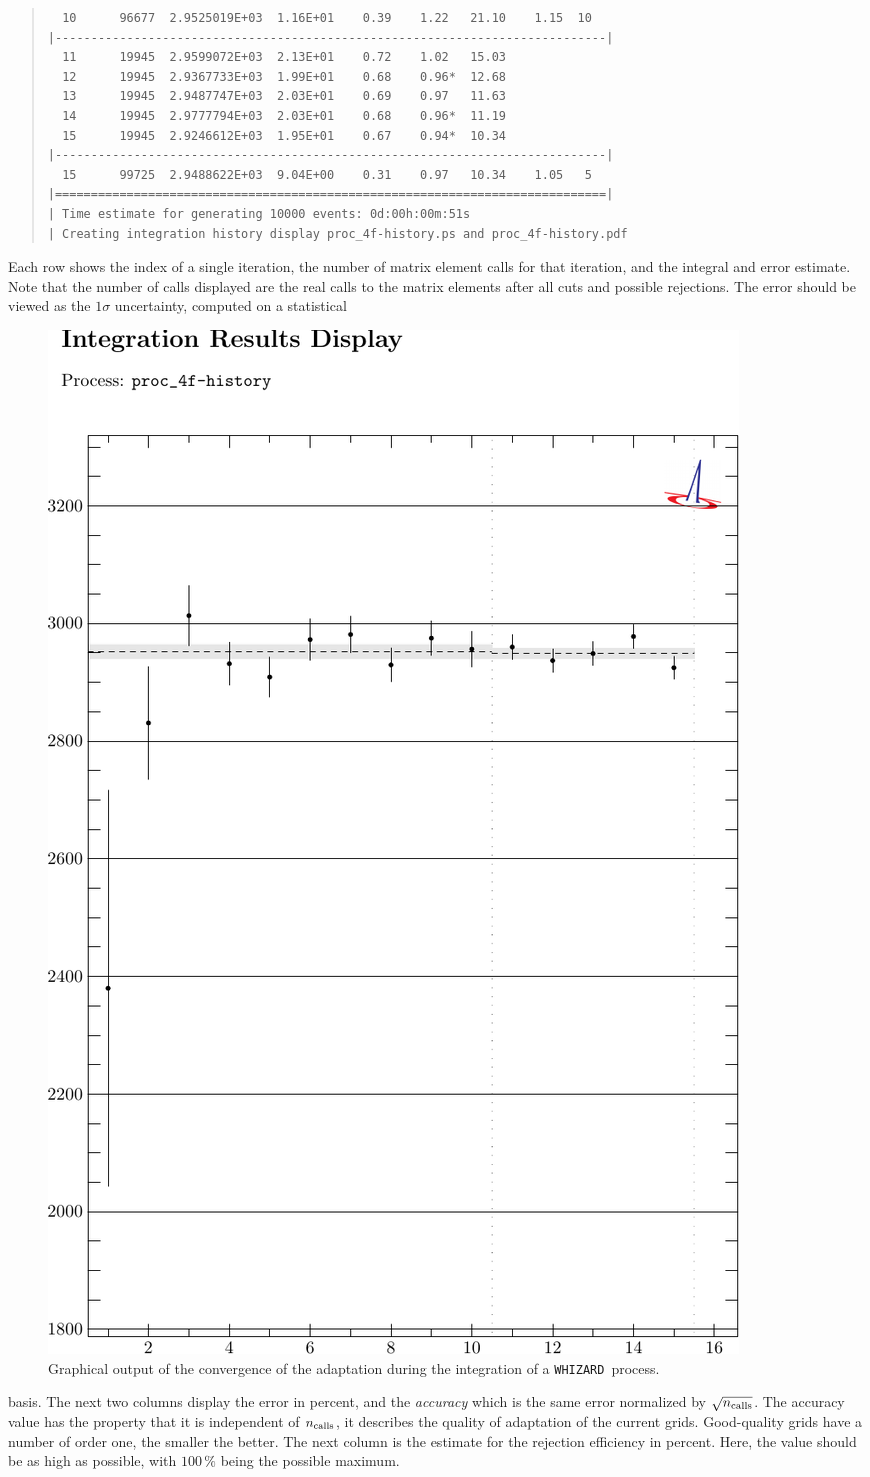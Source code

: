 \documentclass[12pt]{book}
\newcommand{\ttt}[1]{\texttt{#1}}
\newcommand{\whizard}{\ttt{WHIZARD}}
\begin{document}
\begin{quote}
\begin{footnotesize}
\begin{verbatim}
  10      96677  2.9525019E+03  1.16E+01    0.39    1.22   21.10    1.15  10
|-----------------------------------------------------------------------------|
  11      19945  2.9599072E+03  2.13E+01    0.72    1.02   15.03
  12      19945  2.9367733E+03  1.99E+01    0.68    0.96*  12.68
  13      19945  2.9487747E+03  2.03E+01    0.69    0.97   11.63
  14      19945  2.9777794E+03  2.03E+01    0.68    0.96*  11.19
  15      19945  2.9246612E+03  1.95E+01    0.67    0.94*  10.34
|-----------------------------------------------------------------------------|
  15      99725  2.9488622E+03  9.04E+00    0.31    0.97   10.34    1.05   5
|=============================================================================|
| Time estimate for generating 10000 events: 0d:00h:00m:51s
| Creating integration history display proc_4f-history.ps and proc_4f-history.pdf
\end{verbatim}
\end{footnotesize}
\end{quote}
Each row shows the index of a single iteration, the number of matrix element
calls for that iteration, and the integral and error estimate.  Note
that the number of calls displayed are the real calls to the matrix
elements after all cuts and possible rejections. The error
should be viewed as the $1\sigma$ uncertainty, computed on a statistical
\begin{figure}
  \centering
  \includegraphics[width=.56\textwidth]{proc_4f-history}
  \caption{\label{fig:inthistory} Graphical output of the convergence
    of the adaptation during the integration of a \whizard\ process.}
\end{figure}
basis.  The next two columns display the error in percent, and the
\emph{accuracy} which is the same error normalized by $\sqrt{n_{\rm calls}}$.
The accuracy value has the property that it is independent of $n_{\rm calls}$,
it describes the quality of adaptation of the current grids.  Good-quality
grids have a number of order one, the smaller the better.  The next column is
the estimate for the rejection efficiency in percent.  Here, the value should
be as high as possible, with $100\,\%$ being the possible maximum.
\end{document}
